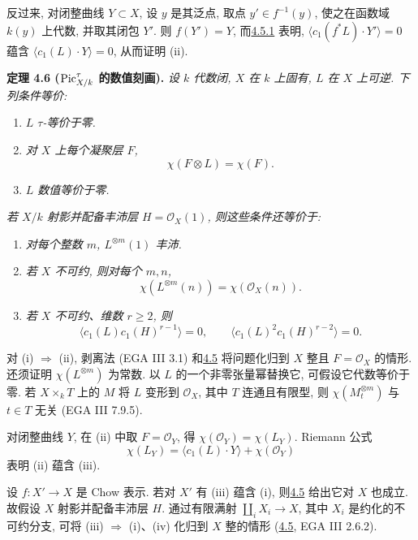 反过来, 对闭整曲线 \(Y\subset X\), 设 \(y\) 是其泛点, 取点 \(y'\in f^{-1}(y)\), 使之在函数域 \(k(y)\) 上代数, 并取其闭包 \(Y'\). 则 \(f(Y')=Y\), 而\hyperlink{sga6.e13.eq.4-5-1}{4.5.1} 表明, \(\langle c_1(f^*L)\cdot Y'\rangle=0\) 蕴含 \(\langle c_1(L)\cdot Y\rangle=0\), 从而证明 (ii).

\textbf{定理 4.6 (\(\operatorname{Pic}^\tau_{X/k}\) 的数值刻画).} \emph{设 \(k\) 代数闭, \(X\) 在 \(k\) 上固有, \(L\) 在 \(X\) 上可逆. 下列条件等价:}
\begin{enumerate}[label=(\roman*)]
\item \emph{\(L\) \(\tau\)-等价于零.}
\item \emph{对 \(X\) 上每个凝聚层 \(F\),}
\[
\chi(F\otimes L)=\chi(F).
\]
\item \emph{\(L\) 数值等价于零.}
\end{enumerate}
\emph{若 \(X/k\) 射影并配备丰沛层 \(H=\mathcal O_X(1)\), 则这些条件还等价于:}
\begin{enumerate}[label=(\roman*),start=4]
\item \emph{对每个整数 \(m\), \(L^{\otimes m}(1)\) 丰沛.}
\item \emph{若 \(X\) 不可约, 则对每个 \(m,n\),}
\[
\chi(L^{\otimes m}(n))=\chi(\mathcal O_X(n)).
\]
\item \emph{若 \(X\) 不可约、维数 \(r\ge2\), 则
\[
\langle c_1(L)c_1(H)^{r-1}\rangle=0,\qquad
\langle c_1(L)^2c_1(H)^{r-2}\rangle=0.
\]}
\end{enumerate}

对 (i) \(\Rightarrow\) (ii), 剥离法 (EGA III 3.1) 和\hyperlink{sga6.e13.prop.4-5}{4.5} 将问题化归到 \(X\) 整且 \(F=\mathcal O_X\) 的情形. 还须证明 \(\chi(L^{\otimes m})\) 为常数. 以 \(L\) 的一个非零张量幂替换它, 可假设它代数等价于零. 若 \(X\times_kT\) 上的 \(M\) 将 \(L\) 变形到 \(\mathcal O_X\), 其中 \(T\) 连通且有限型, 则 \(\chi(M_t^{\otimes m})\) 与 \(t\in T\) 无关 (EGA III 7.9.5).

对闭整曲线 \(Y\), 在 (ii) 中取 \(F=\mathcal O_Y\), 得 \(\chi(\mathcal O_Y)=\chi(L_Y)\). Riemann 公式
\[
\chi(L_Y)=\langle c_1(L)\cdot Y\rangle+\chi(\mathcal O_Y)
\]
表明 (ii) 蕴含 (iii).

设 \(f:X'\to X\) 是 Chow 表示. 若对 \(X'\) 有 (iii) 蕴含 (i), 则\hyperlink{sga6.e13.prop.4-5}{4.5} 给出它对 \(X\) 也成立. 故假设 \(X\) 射影并配备丰沛层 \(H\). 通过有限满射 \(\coprod_iX_i\to X\), 其中 \(X_i\) 是约化的不可约分支, 可将 (iii) \(\Rightarrow\) (i)、(iv) 化归到 \(X\) 整的情形 (\hyperlink{sga6.e13.prop.4-5}{4.5}, EGA III 2.6.2).

